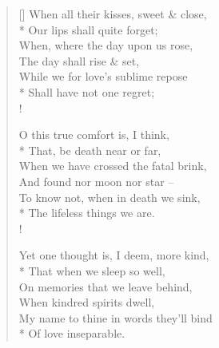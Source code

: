 \documentclass[MAIN]{subfiles}
\begin{document}
\begin{verse}[\versewidth]
When all their kisses, sweet \& close,\\*
\vin Our lips shall quite forget;\\
When, where the day upon us rose,\\
\vin The day shall rise \& set,\\
While we for love's sublime repose\\*
\vin Shall have not one regret;\\!

O this true comfort is, I think,\\*
\vin That, be death near or far,\\
When we have crossed the fatal brink,\\
\vin And found nor moon nor star --\\
To know not, when in death we sink,\\*
\vin The lifeless things we are.\\!

Yet one thought is, I deem, more kind,\\*
\vin That when we sleep so well,\\
On memories that we leave behind,\\
\vin When kindred spirits dwell,\\
My name to thine in words they'll bind\\*
\vin Of love inseparable.
\end{verse}
\end{document}
